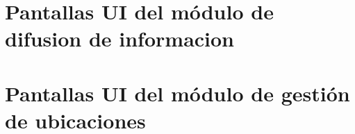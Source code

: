 \section{Pantallas UI del módulo de difusion de informacion}


\clearpage
\section{Pantallas UI del módulo de gestión de ubicaciones}


\clearpage
